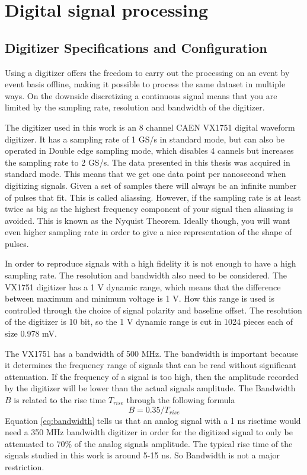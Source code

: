 \documentclass[main.tex]{subfiles}
\begin{document}
\section{Digital signal processing}
\subsection{Digitizer Specifications and Configuration}
Using a digitizer offers the freedom to carry out the processing on an event by event basis offline, making it possible to process the same dataset in multiple ways. On the downside discretizing a continuous signal means that you are limited by the sampling rate, resolution and bandwidth of the digitizer.

The digitizer used in this work is an 8 channel CAEN VX1751 digital waveform digitizer. It has a sampling rate of 1 GS/s in standard mode, but can also be operated in Double edge sampling mode, which disables 4  cannels but increases the sampling rate to 2 GS/s\cite[p.9]{CAEN}. The data presented in this thesis was acquired in standard mode. This means that we get one data point per nanosecond when digitizing signals. Given a set of samples there will always be an infinite number of pulses that fit. This is called aliassing. However, if the sampling rate is at least twice as big as the highest frequency component of your signal then aliassing is avoided. This is known as the Nyquist Theorem. Ideally though, you will want even higher sampling rate in order to give a nice representation of the shape of pulses\cite{Spectrum}. %

In order to reproduce signals with a high fidelity it is not enough to have a high sampling rate. The resolution and bandwidth also need to be considered. The VX1751 digitizer has a 1 V dynamic range, which means that the difference between maximum and minimum voltage is 1 V. How this range is used is controlled through the choice of signal polarity and baseline offset. The resolution of the digitizer is 10 bit, so the 1 V dynamic range is cut in 1024 pieces each of size 0.978 mV\cite{CAEN}. 

The VX1751 has a bandwidth of 500 MHz. The bandwidth is important because it determines the frequency range of signals that can be read without significant attenuation. If the frequency of a signal is too high, then the amplitude recorded by the digitizer will be lower than the actual signals amplitude. The Bandwidth $B$ is related to the rise time $T_{rise}$ through the following formula\cite[p.354]{Leo}
\begin{equation}
\label{eq:bandwidth}
B=0.35/T_{rise}
\end{equation}
Equation \ref{eq:bandwidth} tells us that an analog signal with a 1 ns risetime would need a 350 MHz bandwidth digitizer in order for the digitized signal to only be attenuated to 70\% of the analog signals amplitude. The typical rise time of the signals studied in this work is around 5-15 ns. So Bandwidth is not a major restriction.
\end{document}
